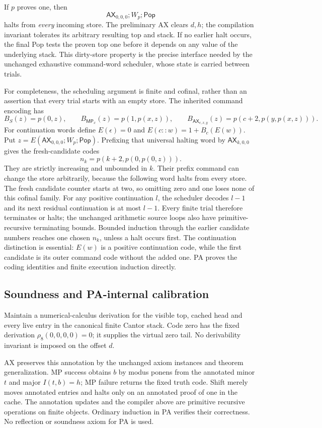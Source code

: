 If $p$ proves one, then
\[
 \mathsf{AX}_{0,0,0};W_p;\mathsf{Pop}
\]
halts from \emph{every} incoming store.  The preliminary AX clears $d,h$;
the compilation invariant tolerates its arbitrary resulting top and stack.
If no earlier halt occurs, the final Pop tests the proven top one before
it depends on any value of the underlying stack.  This dirty-store
property is the precise interface needed by the unchanged exhaustive
command-word scheduler, whose state is carried between trials.

For completeness, the scheduling argument is finite and cofinal, rather
than an assertion that every trial starts with an empty store.  The
inherited command encoding has
\[
 B_S(z)=p(0,z),\qquad B_{\mathsf{MP}_x}(z)=p(1,p(x,z)),\qquad
 B_{\mathsf{AX}_{c,x,y}}(z)=p(c+2,p(y,p(x,z))).
\]
For continuation words define $E(\epsilon)=0$ and
$E(c::w)=1+B_c(E(w))$.  Put
$z=E(\mathsf{AX}_{0,0,0};W_p;\mathsf{Pop})$.
Prefixing that universal halting word by $\mathsf{AX}_{k,0,0}$ gives
the fresh-candidate codes
\[
                 n_k=p(k+2,p(0,p(0,z))).
\]
They are strictly increasing and unbounded in $k$.  Their prefix command
can change the store arbitrarily, because the following word halts from
every store.  The fresh candidate counter starts at two, so omitting zero
and one loses none of this cofinal family.  For any positive continuation
$l$, the scheduler decodes $l-1$ and its next residual continuation is at
most $l-1$.  Every finite trial therefore terminates or halts; the
unchanged arithmetic source loops also have primitive-recursive terminating
bounds.  Bounded induction through the earlier candidate numbers reaches
one chosen $n_k$, unless a halt occurs first.  The continuation distinction
is essential: $E(w)$ is a positive continuation code, while the first
candidate is its outer command code without the added one.  PA proves
the coding identities and finite execution induction directly.

\subsection{Soundness and PA-internal calibration}

Maintain a numerical-calculus derivation for the visible top, cached head
and every live entry in the canonical finite Cantor stack.  Code zero has
the fixed derivation $\rho_8(0,0,0,0)=0$; it supplies the virtual zero tail.
No derivability invariant is imposed on the offset $d$.

AX preserves this annotation by the unchanged axiom instances and theorem
generalization.  MP success obtains $b$ by modus ponens from the annotated
minor $t$ and major $I(t,b)=h$; MP failure returns the fixed truth code.
Shift merely moves annotated entries and halts only on an annotated proof
of one in the cache.  The annotation updates and the compiler above are
primitive recursive operations on finite objects.  Ordinary induction in
PA verifies their correctness.  No reflection or soundness axiom for PA
is used.


